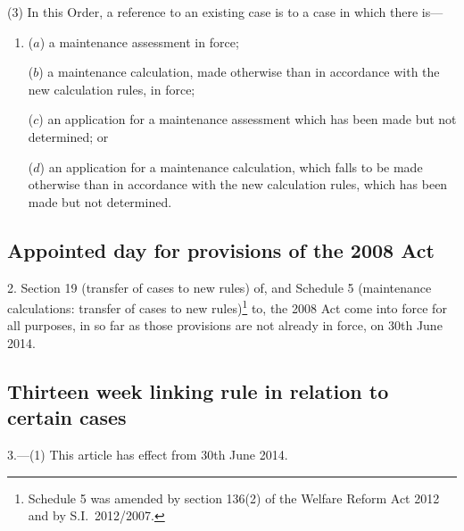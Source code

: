 \documentclass[12pt,a4paper]{article}
\begin{document}
(3) In this Order, a reference to an existing case is to a case in which there is—
\begin{enumerate}\item[]
($a$) a maintenance assessment in force;

($b$) a maintenance calculation, made otherwise than in accordance with the new calculation rules, in force;

($c$) an application for a maintenance assessment which has been made but not determined; or

($d$) an application for a maintenance calculation, which falls to be made otherwise than in accordance with the new calculation rules, which has been made but not determined.
\end{enumerate}

\subsection[2. Appointed day for provisions of the 2008 Act]{Appointed day for provisions of the 2008 Act}

2.  Section 19 (transfer of cases to new rules) of, and Schedule 5 (maintenance calculations: transfer of cases to new rules)\footnote{Schedule 5 was amended by section 136(2) of the Welfare Reform Act 2012 and by S.I.~2012/2007.} to, the 2008 Act come into force for all purposes, in so far as those provisions are not already in force, on 30th June 2014.

\subsection[3. Thirteen week linking rule in relation to certain cases]{Thirteen week linking rule in relation to certain cases}

3.—(1) This article has effect from 30th June 2014.
\end{document}
